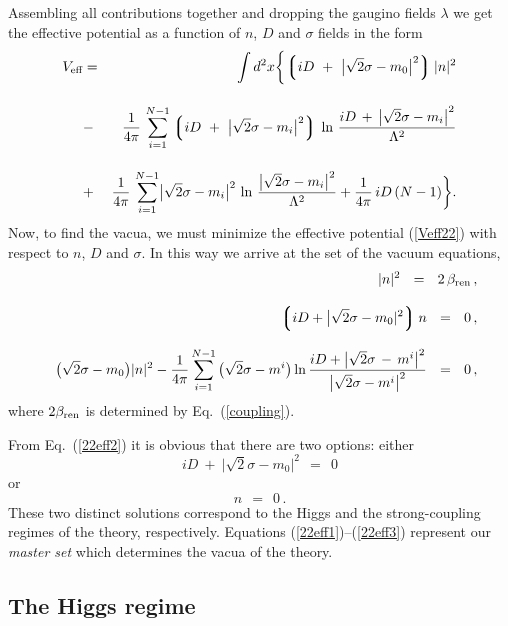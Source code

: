 \documentclass[epsfig,12pt]{article}
\def\beq{\begin{equation}}
\def\eeq{\end{equation}}
\def\beqn{\begin{eqnarray}}
\def\eeqn{\end{eqnarray}}
\def\beqn{\begin{eqnarray}}
\def\eeqn{\end{eqnarray}}
\def\beq{\begin{equation}}
\def\eeq{\end{equation}}
\newcommand{\lgr}{\left\lgroup}
\newcommand{\rgr}{\right\rgroup}
\begin{document}
\vspace{2mm}

Assembling  all contributions together and dropping 
the gaugino fields $\lambda$ we get the effective potential as 
a function of $n$, $D$ and $\sigma$ fields  in
the form
\beqn
	V_\text{eff} & =& \int d^2x 
		\biggl\{  \lgr iD ~+~ \bigl|\sqrt{2}\sigma - m_0\bigr|^2 \rgr |n|^2 
	\nonumber\\[4mm]
	&-& 
	\frac{1}{4\pi}\, \sum_{i=1}^{N-1} \lgr iD ~+~ \bigl|\sqrt{2}\sigma - {m_i}\bigr|^2 \rgr\,
		\ln\, \frac{ iD \,+\, \left| \sqrt{2}\sigma - m_i \right|^2} {\Lambda^2}
\nonumber\\[4mm]
	&+& 
	\frac{1}{4\pi}\, \sum_{i=1}^{N-1} \bigl| \sqrt{2}\sigma - m_i\bigr|^2\,
			\ln\, \frac{ \bigl| \sqrt{2}\sigma -  m_i \bigr|^2 }{ \Lambda^2 }
	+
	\frac{1}{4\pi}\, iD\, (N-1)  \biggr \}  .
	\nonumber\\
	\label{Veff22}
\eeqn
Now, to find the vacua, we must minimize the 
effective potential (\ref{Veff22}) with respect to $n$, $D$ and $ \sigma $. In this way we  arrive at
the set of	the vacuum equations,
\beqn
\label{22eff1}
	&&
	|n|^2  ~~=~~ 2\,\beta_{\rm ren}\,, 
\\[3mm]				
	&&
	\lgr i D + \bigl|\sqrt{2}\sigma - m_0 |^2 \rgr n ~~=~~ 0\,, 
	\label{22eff2}
	\\[3mm]
	&&
	\bigl(\sqrt{2}\sigma - m_0 \bigr)|n|^2 
		-
	\frac{1}{4\pi} \sum_{i=1}^{N-1}\,
			\bigl(\sqrt{2}\sigma - m^i\bigr)\,
		{\rm ln}\, 
		\frac{i D + \bigl| \sqrt{2}\sigma \,-\, m^i \bigr|^2}
		{\bigl| \sqrt{2}\sigma - m^i \bigr|^2}
		 ~~=~~ 0\,,
\label{22eff3}
\nonumber\\
\eeqn
where $2\beta_{\rm ren}$ is determined by Eq.~(\ref{coupling}).

From Eq.~(\ref{22eff2}) it is obvious that there are two options: either
\beq
\label{higgsph22}
	 iD ~+~ \bigl| \sqrt{2}\sigma - m_0 \bigr|^2 ~~=~~ 0  
\eeq
or
\beq
\label{strongph22}
	 n ~~=~~ 0 \,. 
\eeq
	These two distinct solutions correspond to the Higgs and the strong-coupling regimes of the theory, respectively. 
	Equations (\ref{22eff1})--(\ref{22eff3}) represent our {\em master set} which
determines the vacua of the theory. 

\subsection{The Higgs regime}
\label{hireg}
\end{document}
